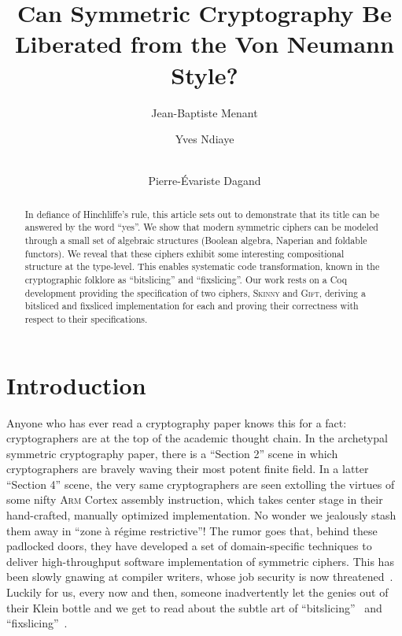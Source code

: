 \documentclass[draft,english]{jflart}
\title{Can Symmetric Cryptography Be Liberated from the Von Neumann
  Style?}
\author[1]{Jean-Baptiste Menant}
\author[2]{Yves Ndiaye}
\author[2,3]{\\Pierre-Évariste Dagand}
\affil[1]{École Normale Supérieure de Lyon}
\affil[2]{Université Paris Cité, IRIF}
\affil[3]{CNRS}
\newcommand{\Skinny}{\textsc{Skinny}}
\newcommand{\Gift}{\textsc{Gift}}
\begin{document}
\maketitle

\begin{abstract}

  In defiance of Hinchliffe's rule, this article sets out to
  demonstrate that its title can be answered by the word ``yes''. We
  show that modern symmetric ciphers can be modeled through a small
  set of algebraic structures (Boolean algebra, Naperian and foldable
  functors). We reveal that these ciphers exhibit some interesting
  compositional structure at the type-level. This enables systematic
  code transformation, known in the cryptographic folklore as
  ``bitslicing'' and ``fixslicing''. Our work rests on a Coq
  development providing the specification of two ciphers, \Skinny{} and
  \Gift{}, deriving a bitsliced and fixsliced implementation for each and
  proving their correctness with respect to their specifications.

\end{abstract}

\section{Introduction}


Anyone who has ever read a cryptography paper knows this for a fact:
cryptographers are at the top of the academic thought chain. In the
archetypal symmetric cryptography paper, there is a ``Section 2''
scene in which cryptographers are bravely waving their most potent
finite field. In a latter ``Section 4'' scene, the very same
cryptographers are seen extolling the virtues of some nifty
\textsc{Arm} Cortex assembly instruction, which takes center stage in
their hand-crafted, manually optimized implementation. No wonder we
jealously stash them away in ``zone à régime restrictive''! The rumor
goes that, behind these padlocked doors, they have developed a set of
domain-specific techniques to deliver high-throughput software
implementation of symmetric ciphers. This has been slowly gnawing at
compiler writers, whose job security is now
threatened~\citep{bernstein:death-compiler,venkatesh:compiler-security}.
Luckily for us, every now and then, someone inadvertently let the
genies out of their Klein bottle and we get to read about the subtle
art of ``bitslicing''~\citep{biham:DES} and
``fixslicing''~\citep{adominicai:fixslicing-gift,
  adomnicai:fixslicing-AES-like}.
\end{document}
